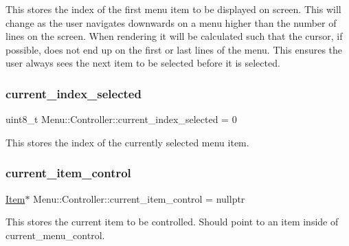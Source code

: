 This stores the index of the first menu item to be displayed on screen. This will change as the user navigates downwards on a menu higher than the number of lines on the screen. When rendering it will be calculated such that the cursor, if possible, does not end up on the first or last lines of the menu. This ensures the user always sees the next item to be selected before it is selected. \hypertarget{class_menu_1_1_controller_ab3bdee08f22d55f8fa0cb9e29bb27d66}{}\label{class_menu_1_1_controller_ab3bdee08f22d55f8fa0cb9e29bb27d66} 
\subsubsection{\texorpdfstring{current\+\_\+index\+\_\+selected}{current\_index\_selected}}
{\footnotesize\ttfamily uint8\+\_\+t Menu\+::\+Controller\+::current\+\_\+index\+\_\+selected = 0\hspace{0.3cm}{\ttfamily [private]}}

This stores the index of the currently selected menu item. \hypertarget{class_menu_1_1_controller_a288e26b1efe4fd953b5514de72a1c508}{}\label{class_menu_1_1_controller_a288e26b1efe4fd953b5514de72a1c508} 
\subsubsection{\texorpdfstring{current\+\_\+item\+\_\+control}{current\_item\_control}}
{\footnotesize\ttfamily \hyperlink{struct_menu_1_1_item}{Item}$\ast$ Menu\+::\+Controller\+::current\+\_\+item\+\_\+control = nullptr\hspace{0.3cm}{\ttfamily [private]}}

This stores the current item to be controlled. Should point to an item inside of current\+\_\+menu\+\_\+control. \hypertarget{class_menu_1_1_controller_a6dfb1678cc8fd44570806ff680ac27cf}{}\label{class_menu_1_1_controller_a6dfb1678cc8fd44570806ff680ac27cf} 
